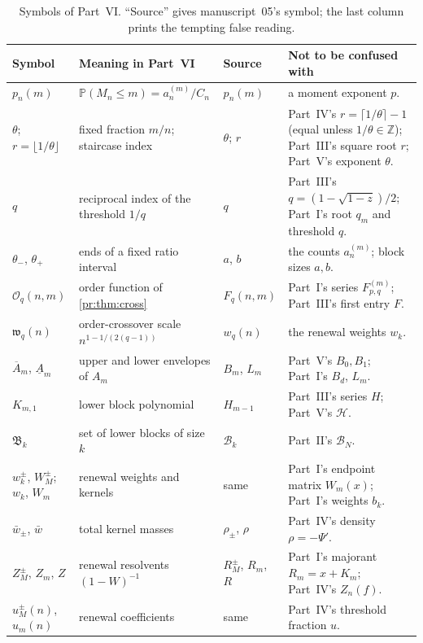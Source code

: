 \documentclass[11pt,a4paper]{article}
\theoremstyle{definition}\newaliascnt{definition}{theorem}
\theoremstyle{remark}\newaliascnt{remark}{theorem}
\newcommand{\Bformal}{\mathcal B}%
\newcommand{\ljP}{\mathbb P}
\begin{document}
\begin{table}[htbp]
\centering\small
\caption{Symbols of Part~VI. ``Source'' gives manuscript~05's symbol; the
last column prints the tempting false reading.}
\label{pr:tab:notation}
\begin{tabular}{>{\raggedright}p{.19\linewidth}>{\raggedright}p{.29\linewidth}>{\raggedright}p{.12\linewidth}>{\raggedright\arraybackslash}p{.28\linewidth}}
\toprule
Symbol & Meaning in Part~VI & Source & Not to be confused with\\
\midrule
$p_n(m)$ & $\ljP(M_n\le m)=a_n^{(m)}/C_n$ & $p_n(m)$ & a moment exponent $p$.\\
$\theta$; $r=\lfloor1/\theta\rfloor$ & fixed fraction $m/n$; staircase index & $\theta$; $r$ &
 Part~IV's $r=\lceil1/\theta\rceil-1$ (equal unless $1/\theta\in\mathbb Z$);
 Part~III's square root $r$; Part~V's exponent $\theta$.\\
$q$ & reciprocal index of the threshold $1/q$ & $q$ & Part~III's
 $q=(1-\sqrt{1-z})/2$; Part~I's root $q_m$ and threshold $q$.\\
$\theta_-$, $\theta_+$ & ends of a fixed ratio interval & $a$, $b$ & the counts
 $a_n^{(m)}$; block sizes $a,b$.\\
$\mathcal O_q(n,m)$ & order function of \cref{pr:thm:cross} & $F_q(n,m)$ &
 Part~I's series $F^{(m)}_{p,q}$; Part~III's first entry $F$.\\
$\mathfrak w_q(n)$ & order-crossover scale $n^{1-1/(2(q-1))}$ & $w_q(n)$ &
 the renewal weights $w_k$.\\
$\overline A_m$, $\underline A_m$ & upper and lower envelopes of $A_m$ &
 $B_m$, $L_m$ & Part~V's $B_0,B_1$; Part~I's $B_d$, $L_m$.\\
$K_{m,1}$ & lower block polynomial & $H_{m-1}$ & Part~III's series $H$;
 Part~V's $\mathcal H$.\\
$\mathfrak B_k$ & set of lower blocks of size $k$ & $\mathcal B_k$ &
 Part~II's $\Bformal_N$.\\
$w_k^\pm$, $W^\pm_M$; $w_k$, $W_m$ & renewal weights and kernels & same &
 Part~I's endpoint matrix $W_m(x)$; Part~I's weights $b_k$.\\
$\bar w_\pm$, $\bar w$ & total kernel masses & $\rho_\pm$, $\rho$ &
 Part~IV's density $\rho=-\Psi'$.\\
$Z^\pm_M$, $Z_m$, $Z$ & renewal resolvents $(1-W)^{-1}$ & $R^\pm_M$, $R_m$,
 $R$ & Part~I's majorant $R_m=x+K_m$; Part~IV's $Z_n(f)$.\\
$u_M^\pm(n)$, $u_m(n)$ & renewal coefficients & same & Part~IV's
 threshold fraction $u$.\\

\end{tabular}
\end{table}
\end{document}
